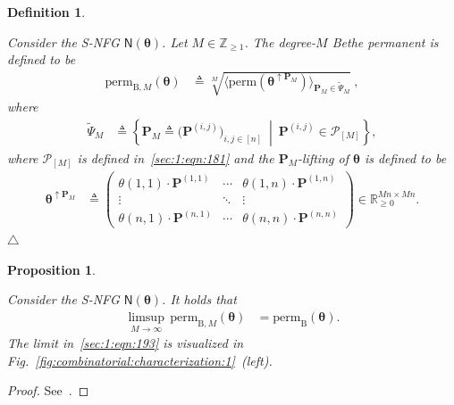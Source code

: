 \documentclass[journal,lettersize,twocolumn]{IEEEtran} %
\newtheorem{proposition}[theorem]{Proposition}
\newtheorem{definition}[theorem]{Definition}
\newcommand{\edefinition}{\hfill$\triangle$}
\newcommand{\set}[1]{\mathcal{#1}}
\newcommand{\sfN}{ \mathsf{N} }
\newcommand{\sR}{\mathbb{R}}
\newcommand{\sZpp}{\mathbb{Z}_{\geq 1}}
\newcommand{\matr}[1]{ \bm{#1} }
\newcommand{\defeq}{ \triangleq }
\newcommand{\perm}{ \mathrm{perm} }
\newcommand{\permb}{ \mathrm{perm}_{\mathrm{B}} }
\newcommand{\permbM}[1]{\perm_{ \mathrm{B}, #1 }}
\newcommand{\setP}{\set{P}}
\newcommand{\mtheta}{\matr{\theta}}
\newcommand{\mP}{\matr{P}}
\newcommand{\tPsi}{\tilde{\Psi}}
\begin{document}
\begin{definition}
  \label{def:matrix:degree:M:cover:1}

  Consider the S-NFG $ \sfN(\mtheta) $. Let $M \in \sZpp$.  The degree-$M$
  Bethe permanent is defined to be
  \begin{align}
    \permbM{M}(\mtheta)
      &\defeq
        \sqrt[M]{
          \bigl\langle
            \perm( \mtheta^{\uparrow \mP_{M}} )
          \bigr\rangle_{\mP_{M} \in \tPsi_{M} }
       } \ , 
         \label{eq:def:degree:M:Bethe:permanent:1:part:2}
  \end{align}
  where 
  \begin{align*}
    \tPsi_{M}
      &\defeq 
        \left\{ 
          \mP_{M} \defeq \bigl( \mP^{(i,j)} \bigr)_{i,j\in [n]}
        \ \middle| \ 
          \mP^{(i,j)} \in \setP_{[M]}
        \right\},
  \end{align*}
  where $ \setP_{[M]} $ is defined in~\eqref{sec:1:eqn:181} and the
  $ \mP_{M} $-lifting of $ \mtheta $ is defined to be
  \begin{align*}
    \mtheta^{\uparrow \mP_{M}}
      &\defeq 
        \left( \begin{smallmatrix}
            \theta(1,1) \cdot  \mP^{(1,1)} 
            & \cdots & \theta(1,n) \cdot  \mP^{(1,n)} \\
            \vdots & \ddots & \vdots \\
            \theta(n,1) \cdot  \mP^{(n,1)} 
            & \cdots & \theta(n,n) \cdot  \mP^{(n,n)} 
           \end{smallmatrix} 
        \right) \in \sR_{\geq 0}^{Mn \times Mn}.
  \end{align*}
  \edefinition
\end{definition}

%

\begin{proposition}
  \label{sec:1:thm:8}
    
  Consider the S-NFG $ \sfN(\mtheta) $. It holds that
  \begin{align}
    \limsup_{M \to \infty} \,
      \permbM{M}(\mtheta)
      &= \permb(\mtheta). 
            \label{sec:1:eqn:193}
  \end{align}
  The limit in~\eqref{sec:1:eqn:193} is visualized in
  Fig.~\ref{fig:combinatorial:characterization:1}~(left).
\end{proposition}

%

\begin{proof}
  See~\cite[Section~VI]{Vontobel2013a}.
\end{proof}
\end{document}

